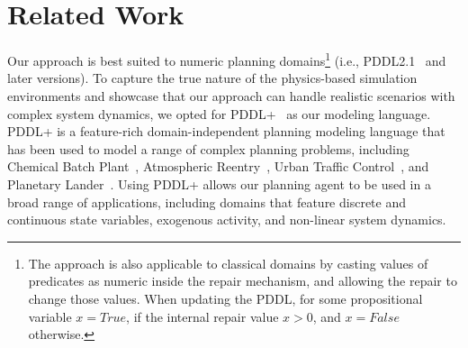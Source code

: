 \documentclass[letterpaper]{article} %
\newcommand{\hydra}{\textsc{Hydra}\xspace} %
\begin{document}







\section{Related Work}

Our approach is best suited to numeric planning domains\footnote{The approach is also applicable to classical domains by casting values of predicates as numeric inside the repair mechanism, and allowing the repair to change those values. When updating the PDDL, for some propositional variable $x=True$, if the internal repair value $x>0$, and $x=False$ otherwise.} (i.e., PDDL2.1~\cite{fox2003pddl2} and later versions). To capture the true nature of the physics-based simulation environments and showcase that our approach can handle realistic scenarios with complex system dynamics, we opted for PDDL+~\cite{fox2006modelling} as our modeling language.
PDDL+ is a feature-rich domain-independent planning modeling language that has been used to model a range of complex planning problems, including Chemical Batch Plant~\cite{della2010pddl+}, Atmospheric Reentry~\cite{piotrowski2018heuristics}, Urban Traffic Control~\cite{vallati2016efficient}, and Planetary Lander~\cite{della2010resource}. 
Using PDDL+ allows our planning agent to be used in a broad range of applications, including domains that feature discrete and continuous state variables, exogenous activity, and non-linear system dynamics.
\end{document}
